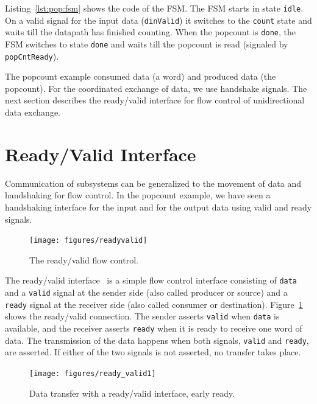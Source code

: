 \documentclass[%
    10pt,
    headinclude, footexclude,
    openright, %
    notitlepage,
    cleardoubleempty,
    headsepline,
    pointlessnumbers,
    bibtotoc, idxtotoc,
    ]{scrbook}
\newcommand{\code}[1]{{\lstinline[basicstyle=\small\ttfamily]{#1}}}
\begin{document}
\newpage
{}

Listing~\ref{lst:pop:fsm} shows the code of the FSM.
The FSM starts in state \code{idle}. On a valid signal for the input data (\code{dinValid}) it
switches to the \code{count} state and waits till the datapath has finished counting.
When the popcount is \code{done}, the FSM switches to state \code{done} and waits till the
popcount is read (signaled by \code{popCntReady}).


The popcount example consumed data (a word) and produced data (the popcount).
For the coordinated exchange of data, we use handshake signals.
The next section describes the ready/valid interface for flow control of
unidirectional data exchange.

\section{Ready/Valid Interface}
\label{sec:ready:valid}

Communication of subsystems can be generalized to the movement
of data and handshaking for flow control. In the popcount example,
we have seen a handshaking interface for the input and for the output data
using valid and ready signals.

\begin{figure}
  \centering
  \texttt{[image: figures/readyvalid]}
  \caption{The ready/valid flow control.}
  \label{fig:readyvalid}
\end{figure}

The ready/valid interface~\cite[p.~480]{dally:vhdl:2016} is a simple flow
control interface consisting of \code{data} and a \code{valid} signal at the
sender side (also called producer or source) and a \code{ready}
signal at the receiver side (also called consumer or destination).
Figure~\ref{fig:readyvalid} shows the ready/valid connection.
The sender asserts \code{valid} when \code{data} is available,
and the receiver asserts \code{ready} when it is ready to receive one word
of data. The transmission of the data happens when both signals, \code{valid}
and \code{ready}, are asserted. If either of the two signals is not asserted,
no transfer takes place.

\begin{figure}
  \centering
  \texttt{[image: figures/ready\_valid1]}
  \caption{Data transfer with a ready/valid interface, early ready.}
  \label{fig:ready_valid1}
\end{figure}
\end{document}
